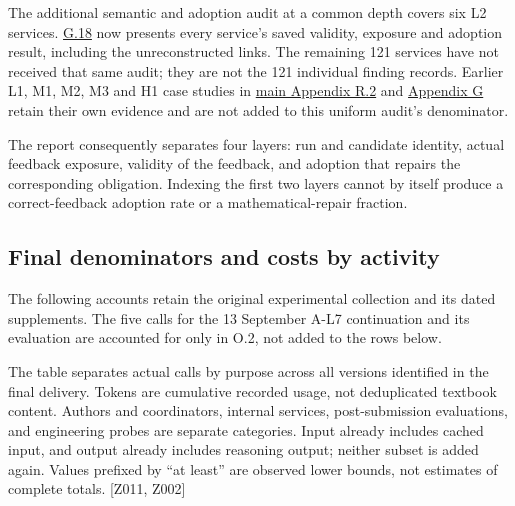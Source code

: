 The additional semantic and adoption audit at a common depth covers six L2 services. \hyperlink{g18}{G.18} now presents every service's saved validity, exposure and adoption result, including the unreconstructed links. The remaining 121 services have not received that same audit; they are not the 121 individual finding records. Earlier L1, M1, M2, M3 and H1 case studies in \hyperlink{r2}{main Appendix R.2} and \hyperlink{appendix-g}{Appendix G} retain their own evidence and are not added to this uniform audit's denominator.

The report consequently separates four layers: run and candidate identity, actual feedback exposure, validity of the feedback, and adoption that repairs the corresponding obligation. Indexing the first two layers cannot by itself produce a correct-feedback adoption rate or a mathematical-repair fraction.

\subsection[Final denominators and costs by activity]{\texorpdfstring{\protect\hypertarget{n5}{}Final denominators and costs by activity}{Final denominators and costs by activity}}
The following accounts retain the original experimental collection and its dated supplements. The five calls for the 13 September A-L7 continuation and its evaluation are accounted for only in O.2, not added to the rows below.

The table separates actual calls by purpose across all versions identified in the final delivery. Tokens are cumulative recorded usage, not deduplicated textbook content. Authors and coordinators, internal services, post-submission evaluations, and engineering probes are separate categories. Input already includes cached input, and output already includes reasoning output; neither subset is added again. Values prefixed by “at least” are observed lower bounds, not estimates of complete totals. [Z011, Z002]

